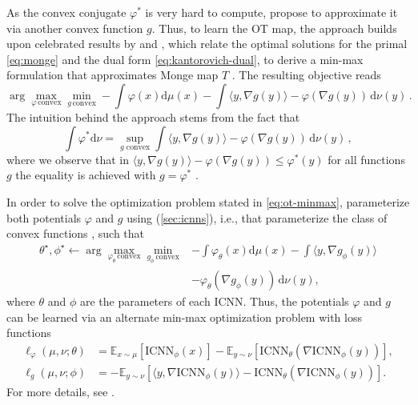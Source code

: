 As the convex conjugate $\varphi^*$ is very hard to compute, \citet{makkuva2020optimal} propose to approximate it via another convex function $g$.
Thus, to learn the \acrlong{OT} map, the approach builds upon celebrated results by \citet{knott1984optimal} and \citet{brenier1991polar}, which relate the optimal solutions for the primal \eqref{eq:monge} and the dual form \eqref{eq:kantorovich-dual}, to derive a min-max formulation that approximates Monge map $T$ \citep[Theorem 3.3]{makkuva2020optimal}.
The resulting objective reads
\begin{equation} \label{eq:ot-minmax}
	\arg \max_{\varphi  \, \text{convex}} \min_{g \, \text{convex}}  -\int \varphi(x) \mathrm{d} \mu(x) -\int \langle y, \nabla g(y)\rangle - \varphi(\nabla g(y)) \,\mathrm{d} \nu(y)\,.
\end{equation}
The intuition behind the approach stems from the fact that
\begin{equation*}
	\int \varphi^*\textrm{d}\nu = \sup _{g \text{ convex}} \int \langle y, \nabla g(y)\rangle - \varphi(\nabla g(y))\,\mathrm{d} \nu(y)\,,
\end{equation*}
where we observe that in $\langle y, \nabla g(y)\rangle - \varphi(\nabla g(y)) \leq \varphi^*(y)$ for all functions $g$ the equality is achieved with $g = \varphi^*$ \citep[Theorem 3.3]{makkuva2020optimal}. 

In order to solve the optimization problem stated in \eqref{eq:ot-minmax}, \citet{makkuva2020optimal} parameterize both potentials $\varphi$ and $g$ using  (\cref{sec:icnns}), i.e.,  that parameterize the class of convex functions \citep{amos2017input}, such that
\begin{align} \label{eq:cellot-optim}
	\nonumber \theta^\star, \phi^\star \leftarrow \arg \max_{\varphi_\theta  \, \text{convex}} \min_{g_\phi \, \text{convex}}  &-\int \varphi_\theta(x) \mathrm{d} \mu(x) -\int \langle y, \nabla g_\phi(y)\rangle \\
	&- \varphi_\theta(\nabla g_\phi(y)) \,\mathrm{d} \nu(y),
\end{align}
where $\theta$ and $\phi$ are the parameters of each \acrshort{ICNN}.
Thus, the potentials $\varphi$ and $g$ can be learned via an alternate min-max optimization problem with loss functions
\begin{align} 
	\label{eq:makkuva_f_loss}
    \ell_\varphi(\mu, \nu; \theta) &= \mathbb{E}_{x \sim \mu}[\text{ICNN}_{\phi}(x)] - \mathbb{E}_{y \sim \nu}[\text{ICNN}_{\theta}(\nabla \text{ICNN}_{\phi}(y))],   \\
    \label{eq:makkuva_g_loss}
    \ell_g(\mu, \nu; \phi) &= -\mathbb{E}_{y \sim \nu}[\langle y, \nabla \text{ICNN}_{\phi}(y)\rangle-\text{ICNN}_{\theta}(\nabla \text{ICNN}_{\phi}(y))].
\end{align}
For more details, see \citet{makkuva2020optimal, korotin2021neural}.


